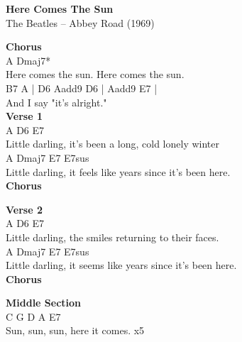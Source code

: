 \documentclass[a4paper]{article}
\begin{document}
    \begin{center}
        \textbf{Here Comes The Sun}
        ~\\
        The Beatles -- Abbey Road (1969)
    \end{center}
    {
        \scriptsize
        \textbf{Chorus}
        ~\\
        {
            \cutive
            \obeyspaces
A                   Dmaj7*
\\
Here comes the sun. Here comes the sun.
\\
B7         A               | D6  Aadd9  D6 | Aadd9  E7 |
\\
And I say "it's alright."
\\

        }
        \textbf{Verse 1}
        ~\\
        {
            \cutive
            \obeyspaces
A                           D6                E7
\\
Little darling, it's been a long, cold lonely winter
\\
A                             Dmaj7                 E7     E7sus
\\
Little darling, it feels like years since it's been here.
\\

        }
        \textbf{Chorus}
        ~\\
        {
            \cutive
            \obeyspaces

        }
        \textbf{Verse 2}
        ~\\
        {
            \cutive
            \obeyspaces
A                           D6                E7
\\
Little darling, the smiles returning to their faces.
\\
A                             Dmaj7                 E7     E7sus
\\
Little darling, it seems like years since it's been here.
\\

        }
        \textbf{Chorus}
        ~\\
        {
            \cutive
            \obeyspaces

        }
        \textbf{Middle Section}
        ~\\
        {
            \cutive
            \obeyspaces
C     G     D            A      E7
\\
Sun,  sun,  sun, here it comes.      x5
\\

}}
\end{document}
